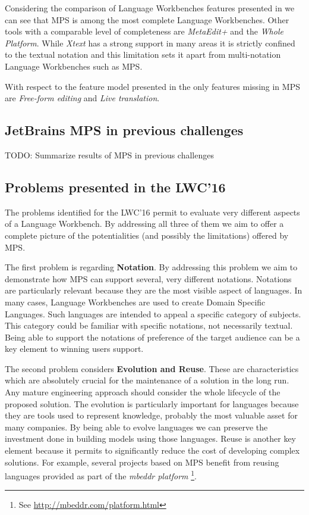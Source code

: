 \documentclass[preprint,numbers,10pt]{sigplanconf}
\begin{document}
Considering the comparison of Language Workbenches features presented in \cite{erdweg2015evaluating} we can see that MPS is among the most complete Language Workbenches. Other tools with a comparable level of completeness are \emph{MetaEdit+} and the \emph{Whole Platform}. While \emph{Xtext} \cite{Eysholdt2010} has a strong support in many areas it is strictly confined to the textual notation and this limitation sets it apart from multi-notation Language Workbenches such as MPS.

With respect to the feature model presented in \cite{erdweg2015evaluating} the only features missing in MPS are \emph{Free-form editing} and \emph{Live translation}.

\subsection{JetBrains MPS in previous challenges}

TODO: Summarize results of MPS in previous challenges

\subsection{Problems presented in the LWC'16}

The problems identified for the LWC'16 permit to evaluate very different aspects of a Language Workbench. By addressing all three of them we aim to offer a complete picture of the potentialities (and possibly the limitations) offered by MPS.

The first problem is regarding \textbf{Notation}. By addressing this problem we aim to demonstrate how MPS can support several, very different notations. Notations are particularly relevant because they are the most visible aspect of languages. In many cases, Language Workbenches are used to create Domain Specific Languages. Such languages are intended to appeal a specific category of subjects. This category could be familiar with specific notations, not necessarily textual. Being able to support the notations of preference of the target audience can be a key element to winning users support. 

The second problem considers \textbf{Evolution and Reuse}. These are characteristics which are absolutely crucial for the maintenance of a solution in the long run. Any mature engineering approach should consider the whole lifecycle of the proposed solution. The evolution is particularly important for languages because they are tools used to represent knowledge, probably the most valuable asset for many companies. By being able to evolve languages we can preserve the investment done in building models using those languages. Reuse is another key element because it permits to significantly reduce the cost of developing complex solutions. For example, several projects based on MPS benefit from reusing languages provided as part of the \emph{mbeddr platform} \footnote{See \url{http://mbeddr.com/platform.html}}.
\end{document}
